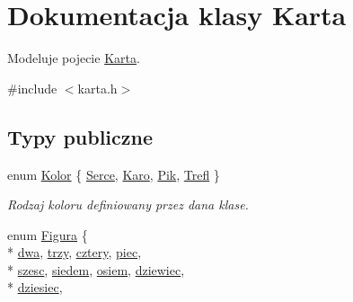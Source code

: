 \hypertarget{class_karta}{\section{Dokumentacja klasy Karta}
\label{class_karta}
}


Modeluje pojecie \hyperlink{class_karta}{Karta}.  




{\ttfamily \#include $<$karta.\-h$>$}

\subsection*{Typy publiczne}
\begin{DoxyCompactItemize}
\item 
enum \hyperlink{class_karta_ab4fee277728f803ca6687783572b2416}{Kolor} \{ \hyperlink{class_karta_ab4fee277728f803ca6687783572b2416af4349610dc5f4a2de2cfebb0fd4404cd}{Serce}, 
\hyperlink{class_karta_ab4fee277728f803ca6687783572b2416a3c8872fc51c8b298d16fce095c922c43}{Karo}, 
\hyperlink{class_karta_ab4fee277728f803ca6687783572b2416ac0cfc341f21d15a967e2d34af90fcc16}{Pik}, 
\hyperlink{class_karta_ab4fee277728f803ca6687783572b2416a72acc44934faa1dd17c5c7251c898449}{Trefl}
 \}
\begin{DoxyCompactList}\small\item\em Rodzaj koloru definiowany przez dana klase. \end{DoxyCompactList}\item 
enum \hyperlink{class_karta_a7f71c15a03e9b8d4103c8734f2ec1f1b}{Figura} \{ \\*
\hyperlink{class_karta_a7f71c15a03e9b8d4103c8734f2ec1f1bad989d3d518460ecaebbe45da9505d200}{dwa}, 
\hyperlink{class_karta_a7f71c15a03e9b8d4103c8734f2ec1f1ba09dcdacd37c336e9ba89f46df55962a4}{trzy}, 
\hyperlink{class_karta_a7f71c15a03e9b8d4103c8734f2ec1f1ba69e7bf2f0d9d920eb48334d74c83ffbf}{cztery}, 
\hyperlink{class_karta_a7f71c15a03e9b8d4103c8734f2ec1f1ba966c6a6216d9801f9054d9b30c5d12f4}{piec}, 
\\*
\hyperlink{class_karta_a7f71c15a03e9b8d4103c8734f2ec1f1ba365ed06e290993e55f2e2fdbbcc301fc}{szesc}, 
\hyperlink{class_karta_a7f71c15a03e9b8d4103c8734f2ec1f1bae3fde40299c4c2e221a86cd5398ea420}{siedem}, 
\hyperlink{class_karta_a7f71c15a03e9b8d4103c8734f2ec1f1ba177b4e9c585d347e8f55f4823ced29d9}{osiem}, 
\hyperlink{class_karta_a7f71c15a03e9b8d4103c8734f2ec1f1ba77e694d8d21ecffcff103a18da68fe3d}{dziewiec}, 
\\*
\hyperlink{class_karta_a7f71c15a03e9b8d4103c8734f2ec1f1bae9a724460b40cc4350fe86a8c49158bc}{dziesiec}, 

\end{DoxyCompactItemize}
